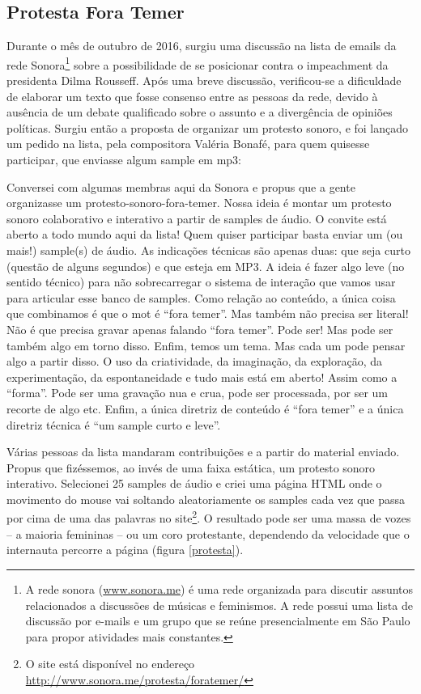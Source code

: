 \subsection{Protesta Fora Temer}
Durante o mês de outubro de 2016, surgiu uma discussão na lista de emails da rede Sonora\footnote{A rede sonora (\url{www.sonora.me}) é uma rede organizada para discutir assuntos relacionados a discussões de músicas e feminismos. A rede possui uma lista de discussão por e-mails e um grupo que se reúne presencialmente em São Paulo para propor atividades mais constantes.} sobre a possibilidade de se posicionar contra o impeachment da presidenta Dilma Rousseff. Após uma breve discussão, verificou-se a dificuldade de elaborar um texto que fosse consenso entre as pessoas da rede, devido à ausência de um debate qualificado sobre o assunto e a divergência de opiniões políticas. 
Surgiu então a proposta de organizar um protesto sonoro, e foi lançado um pedido na lista, pela compositora Valéria Bonafé, para quem quisesse participar, que enviasse algum sample em mp3: 
\begin{citacao}

Conversei com algumas membras aqui da Sonora e propus que a gente organizasse um protesto-sonoro-fora-temer. Nossa ideia é montar um protesto sonoro colaborativo e interativo a partir de samples de áudio. O convite está aberto a todo mundo aqui da lista! Quem quiser participar basta enviar um (ou mais!) sample(s) de áudio. As indicações técnicas são apenas duas: que seja curto (questão de alguns segundos) e que esteja em MP3. A ideia é fazer algo leve (no sentido técnico) para não sobrecarregar o sistema de interação que vamos usar para articular esse banco de samples. Como relação ao conteúdo, a única coisa que combinamos é que o mot é “fora temer”. Mas também não precisa ser literal! Não é que precisa gravar apenas falando “fora temer”. Pode ser! Mas pode ser também algo em torno disso. Enfim, temos um tema. Mas cada um pode pensar algo a partir disso. O uso da criatividade, da imaginação, da exploração, da experimentação, da espontaneidade e tudo mais está em aberto! Assim como a “forma”. Pode ser uma gravação nua e crua, pode ser processada, por ser um recorte de algo etc. Enfim, a única diretriz de conteúdo é “fora temer” e a única diretriz técnica é “um sample curto e leve”.
\end{citacao}
Várias pessoas da lista mandaram contribuições e a partir do material enviado. Propus que fizéssemos, ao invés de uma faixa estática, um protesto sonoro interativo. Selecionei 25 samples de áudio e criei uma página HTML onde o movimento do mouse vai soltando aleatoriamente os samples cada vez que passa por cima de uma das palavras no site\footnote{O site está disponível no endereço \url{http://www.sonora.me/protesta/foratemer/}}. O resultado pode ser uma massa de vozes -- a maioria femininas -- ou um coro protestante, dependendo da velocidade que o internauta percorre a página (figura \ref{protesta}). 

